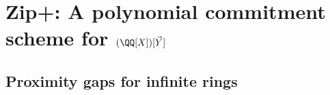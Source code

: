 \documentclass[11pt]{article}
\title{\theetitle}
\begin{document}
\maketitle

\section{Zip+: A polynomial commitment scheme for $(\QQ[X])[\vec Y]$}

	
\subsection{Proximity gaps for infinite rings}
\label{sec:proximity-gap}


\renewcommand*{\bibfont}{\small}
\printbibliography
\end{document}
